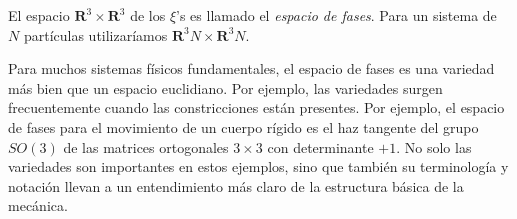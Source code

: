 \documentclass[a4paper,10pt]{article}
\numberwithin{equation}{section}
\begin{document}
\vspace{.3cm}

El espacio $\mathbf{R}^3\times\mathbf{R}^3$ de los $\xi$'s es llamado el \emph{espacio de 
fases}. Para un sistema de $N$ partículas utilizaríamos $\mathbf{R}^3N\times\mathbf{R}^3N$. 

\vspace{.3cm}

Para muchos sistemas físicos fundamentales, el espacio de fases es una variedad más bien 
que un espacio euclidiano. Por ejemplo, las variedades surgen frecuentemente cuando 
las constricciones están presentes. Por ejemplo, el espacio de fases para el movimiento 
de un cuerpo rígido es el haz tangente del grupo $SO(3)$ de las matrices ortogonales 
$3 \times 3$ con determinante $+1$. No solo las variedades son importantes en estos
ejemplos, sino que también su terminología y notación llevan a un entendimiento más 
claro de la estructura básica de la mecánica.
\end{document}
